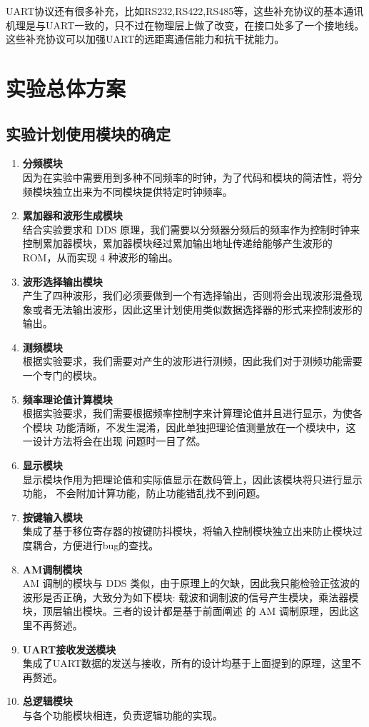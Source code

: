 {\begin{spacing}{1.5}
			UART协议还有很多补充，比如RS232,RS422,RS485等，这些补充协议的基本通讯机理是与UART一致的，只不过在物理层上做了改变，在接口处多了一个接地线。这些补充协议可以加强UART的远距离通信能力和抗干扰能力。
	\section{实验总体方案}
		\subsection{实验计划使用模块的确定}
			\begin{enumerate}
				\item \textbf{分频模块}\\
					因为在实验中需要用到多种不同频率的时钟，为了代码和模块的简洁性，将分频模块独立出来为不同模块提供特定时钟频率。
				\item \textbf{累加器和波形生成模块}\\
					结合实验要求和 DDS 原理，我们需要以分频器分频后的频率作为控制时钟来控制累加器模块，累加器模块经过累加输出地址传递给能够产生波形的 ROM，从而实现 4 种波形的输出。
				\item \textbf{波形选择输出模块}\\
					产生了四种波形，我们必须要做到一个有选择输出，否则将会出现波形混叠现象或者无法输出波形，因此这里计划使用类似数据选择器的形式来控制波形的输出。
				\item \textbf{测频模块}\\
					根据实验要求，我们需要对产生的波形进行测频，因此我们对于测频功能需要一个专门的模块。
				\item \textbf{频率理论值计算模块}\\
					根据实验要求，我们需要根据频率控制字来计算理论值并且进行显示，为使各个模块 功能清晰，不发生混淆，因此单独把理论值测量放在一个模块中，这一设计方法将会在出现 问题时一目了然。
				\item \textbf{显示模块}\\
					显示模块作用为把理论值和实际值显示在数码管上，因此该模块将只进行显示功能， 不会附加计算功能，防止功能错乱找不到问题。
				\item \textbf{按键输入模块}\\
					集成了基于移位寄存器的按键防抖模块，将输入控制模块独立出来防止模块过度耦合，方便进行bug的查找。
				\item \textbf{AM调制模块}\\
					AM 调制的模块与 DDS 类似，由于原理上的欠缺，因此我只能检验正弦波的波形是否正确，大致分为如下模块: 载波和调制波的信号产生模块，乘法器模块，顶层输出模块。三者的设计都是基于前面阐述 的 AM 调制原理，因此这里不再赘述。
				\item \textbf{UART接收发送模块}\\
					集成了UART数据的发送与接收，所有的设计均基于上面提到的原理，这里不再赘述。
				\item \textbf{总逻辑模块}\\
					与各个功能模块相连，负责逻辑功能的实现。
			\end{enumerate}

\end{spacing}}

